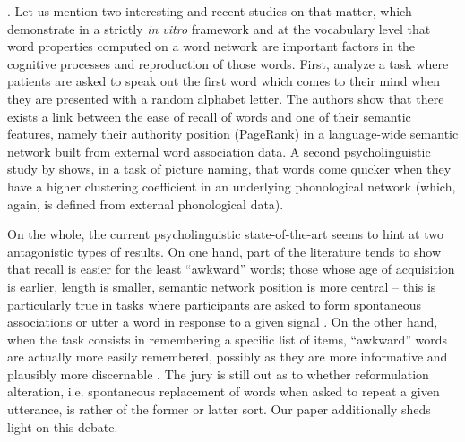  . Let us mention two interesting and recent studies on that matter, which demonstrate in a strictly \emph{in vitro} framework and at the vocabulary level that word properties computed on a word network are important factors in the cognitive processes and reproduction of those words. %
First, \citet{Griffiths07} analyze a task where patients are asked to speak out the first word which comes to their mind when they are presented with a random alphabet letter. The authors show that there exists a link between the ease of recall of words and one of their semantic features, namely their authority position (PageRank) in a language-wide semantic network built from external word association data. %
A second psycholinguistic study by \citet{Chan10} shows, in a task of picture naming, that words come quicker when they have a higher clustering coefficient in an underlying phonological network (which, again, is  defined from external phonological data). %

On the whole, the current psycholinguistic state-of-the-art seems to hint at two antagonistic types of results.  On one hand, part of the literature tends to show that recall is easier for the least ``awkward'' words; those whose age of acquisition is earlier, length is smaller, semantic network position is more central -- this is particularly true in tasks where participants are asked to form spontaneous associations or utter a word in response to a given signal \CN. On the other hand, when the task consists in remembering a specific list of items, ``awkward'' words are actually more easily remembered, possibly as they are more informative and plausibly more discernable \CN. The jury is still out as to whether reformulation alteration, i.e. spontaneous replacement of words when asked to repeat a given utterance, is rather of the former or latter sort.  Our paper additionally sheds light on this debate.

